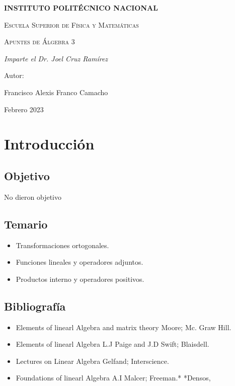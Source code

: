 \documentclass{book}
\begin{document}
\begin{titlepage}
\centering
{\bfseries\LARGE INSTITUTO POLITÉCNICO NACIONAL \par}
\vspace{1cm}
{\scshape\Large Escuela Superior de Física y Matemáticas \par}
\vspace{3cm}
{\scshape\Huge Apuntes de Álgebra 3 \par}
\vspace{3cm}
{\itshape\Large Imparte el Dr. Joel Cruz Ramírez  \par}
\vfill
{\Large Autor: \par}
{\Large Francisco Alexis Franco Camacho \par}
\vfill
{\Large Febrero 2023 \par}
\end{titlepage}
\tableofcontents
\chapter{Introducción}
\section{Objetivo}
No dieron objetivo
\section{Temario}
\begin{itemize}
\item Transformaciones ortogonales.
\item Funciones lineales y operadores adjuntos.
\item Productos interno y operadores positivos.

\end{itemize}
\section{Bibliografía}
\begin{itemize}
    \item Elements of linearl Algebra and matrix theory Moore; Mc. Graw Hill.
    \item Elements of linearl Algebra L.J Paige and J.D Swift; Blaisdell.
    \item Lectures on Linear Algebra Gelfand; Interscience.
    \item Foundations of linearl Algebra A.I Malcer; Freeman.*
    *Densos,
\end{itemize}
\end{document}
